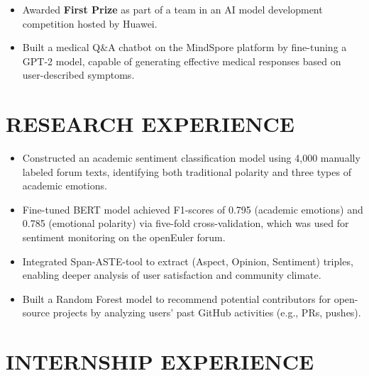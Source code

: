 \documentclass{resume}
\begin{document}
\begin{itemize}
    \item Awarded \textbf{First Prize} as part of a team in an AI model development competition hosted by Huawei.
    \item Built a medical Q\&A chatbot on the MindSpore platform by fine-tuning a GPT-2 model, capable of generating effective medical responses based on user-described symptoms.
\end{itemize}


\section{\bf RESEARCH EXPERIENCE}

\begin{itemize}
    \item Constructed an academic sentiment classification model using 4,000 manually labeled forum texts, identifying both traditional polarity and three types of academic emotions.
    \item Fine-tuned BERT model achieved F1-scores of 0.795 (academic emotions) and 0.785 (emotional polarity) via five-fold cross-validation, which was used for sentiment monitoring on the openEuler forum.
    \item Integrated Span-ASTE-tool to extract (Aspect, Opinion, Sentiment) triples, enabling deeper analysis of user satisfaction and community climate.
\end{itemize}

\begin{itemize}
    \item Built a Random Forest model to recommend potential contributors for open-source projects by analyzing users' past GitHub activities (e.g., PRs, pushes).
\end{itemize}



\section{\bf INTERNSHIP EXPERIENCE}
\end{document}
